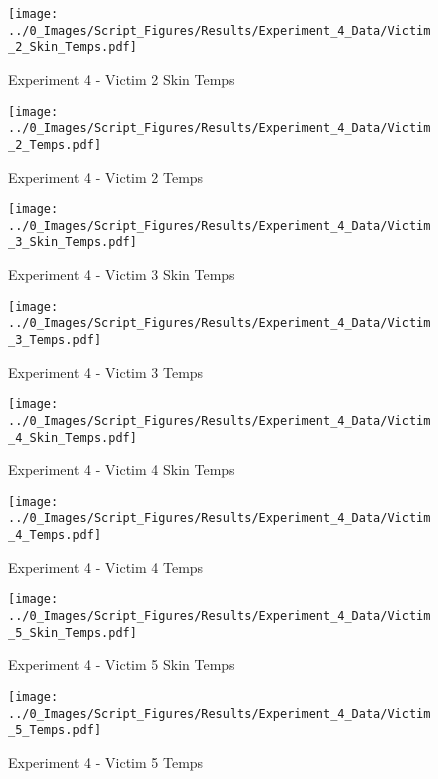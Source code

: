 	\begin{figure}[H]
		\centering
		\texttt{[image: ../0\_Images/Script\_Figures/Results/Experiment\_4\_Data/Victim\_2\_Skin\_Temps.pdf]}
		\caption[]{Experiment 4 - Victim 2 Skin Temps}
	\end{figure}
 
	\clearpage

	\begin{figure}[H]
		\centering
		\texttt{[image: ../0\_Images/Script\_Figures/Results/Experiment\_4\_Data/Victim\_2\_Temps.pdf]}
		\caption[]{Experiment 4 - Victim 2 Temps}
	\end{figure}
 

	\begin{figure}[H]
		\centering
		\texttt{[image: ../0\_Images/Script\_Figures/Results/Experiment\_4\_Data/Victim\_3\_Skin\_Temps.pdf]}
		\caption[]{Experiment 4 - Victim 3 Skin Temps}
	\end{figure}
 
	\clearpage

	\begin{figure}[H]
		\centering
		\texttt{[image: ../0\_Images/Script\_Figures/Results/Experiment\_4\_Data/Victim\_3\_Temps.pdf]}
		\caption[]{Experiment 4 - Victim 3 Temps}
	\end{figure}
 

	\begin{figure}[H]
		\centering
		\texttt{[image: ../0\_Images/Script\_Figures/Results/Experiment\_4\_Data/Victim\_4\_Skin\_Temps.pdf]}
		\caption[]{Experiment 4 - Victim 4 Skin Temps}
	\end{figure}
 
	\clearpage

	\begin{figure}[H]
		\centering
		\texttt{[image: ../0\_Images/Script\_Figures/Results/Experiment\_4\_Data/Victim\_4\_Temps.pdf]}
		\caption[]{Experiment 4 - Victim 4 Temps}
	\end{figure}
 

	\begin{figure}[H]
		\centering
		\texttt{[image: ../0\_Images/Script\_Figures/Results/Experiment\_4\_Data/Victim\_5\_Skin\_Temps.pdf]}
		\caption[]{Experiment 4 - Victim 5 Skin Temps}
	\end{figure}
 
	\clearpage

	\begin{figure}[H]
		\centering
		\texttt{[image: ../0\_Images/Script\_Figures/Results/Experiment\_4\_Data/Victim\_5\_Temps.pdf]}
		\caption[]{Experiment 4 - Victim 5 Temps}
	\end{figure}
 


